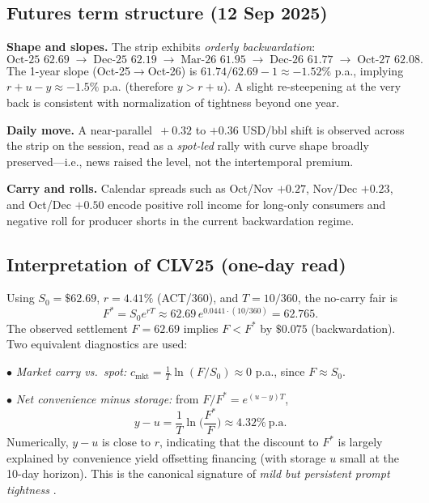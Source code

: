 \documentclass[10pt,a4paper]{article} %
\begin{document}
\subsection{Futures term structure (12 Sep 2025)}
\textbf{Shape and slopes.} The strip exhibits \emph{orderly backwardation}:
\[
\text{Oct-25 } \mathbf{62.69} \;\rightarrow\; \text{Dec-25 } \mathbf{62.19}
\;\rightarrow\; \text{Mar-26 } \mathbf{61.95}
\;\rightarrow\; \text{Dec-26 } \mathbf{61.77}
\;\rightarrow\; \text{Oct-27 } \mathbf{62.08}.
\]
The 1-year slope (Oct-25\(\to\)Oct-26) is \(61.74/62.69-1\approx \mathbf{-1.52\%}\) p.a., implying \(r+u-y\approx -1.5\%\) p.a. (therefore \(y>r+u\)). A slight re-steepening at the very back is consistent with normalization of tightness beyond one year.

\textbf{Daily move.} A near-parallel \(\,+0.32\) to \(+0.36\) USD/bbl shift is observed across the strip on the session, read as a \emph{spot-led} rally with curve shape broadly preserved—i.e., news raised the level, not the intertemporal premium.

\textbf{Carry and rolls.} Calendar spreads such as Oct/Nov \(+0.27\), Nov/Dec \(+0.23\), and Oct/Dec \(+0.50\) encode positive roll income for long-only consumers and negative roll for producer shorts in the current backwardation regime.

\subsection{Interpretation of \texorpdfstring{CLV25}{CLV25} (one-day read)}
Using \(S_0=\$62.69\), \(r=4.41\%\) (ACT/360), and \(T=10/360\), the no-carry fair is
\[
F^{*}=S_0 e^{rT} \approx 62.69\,e^{0.0441\cdot(10/360)}=\mathbf{62.765}.
\]
The observed settlement \(F=\mathbf{62.69}\) implies \(F<F^{*}\) by \(\$0.075\) (backwardation). Two equivalent diagnostics are used:

\(\bullet\) \emph{Market carry vs.\ spot:} \(c_{\text{mkt}}=\frac{1}{T}\ln(F/S_0)\approx 0\) p.a., since \(F\approx S_0\).

\(\bullet\) \emph{Net convenience minus storage:} from \(F/F^{*}=e^{(u-y)T}\),
\[
y-u=\frac{1}{T}\ln\!\Big(\frac{F^{*}}{F}\Big)\approx \mathbf{4.32\%}\ \text{p.a.}
\]
Numerically, \(y-u\) is close to \(r\), indicating that the discount to \(F^{*}\) is largely explained by convenience yield offsetting financing (with storage \(u\) small at the 10-day horizon). This is the canonical signature of \emph{mild but persistent prompt tightness} \citep{eia_backwardation_2013,milonas_convenience_2024}.
\end{document}
